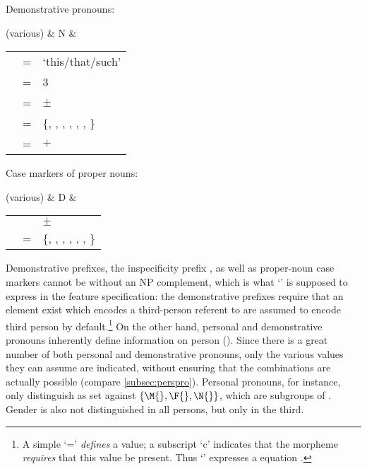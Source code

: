 \a Demonstrative pronouns:\medskip

	\begin{tabu} {}
	(various)
		& N
		& \begin{tabular}[t]{l l l}
			\ups{\Pred} & = & `this/that/such' \\
			\ups{\Pers} & = & 3 \\
			\ups{\Anim} & = & $\pm$ \\
			\ups{\Case} & = & \{\Aarg{}, \Parg{}, \Dat{}, \Gen{}, 
				\Loc{}, \Ins{}, \Caus{}\} \\
			\ups{\Spec} & = & $+$ \\
		\end{tabular}
	\end{tabu}
	
\a\label{ex:dlexsem-propn} Case markers of proper nouns:\medskip	
	
	\begin{tabu} {}
	(various)
		& D
		& \begin{tabular}[t]{l l l}
			\ups{\Anim} & \req{} & $\pm$ \\
			\ups{\Case} & = & \{\Aarg{}, \Parg{}, \Dat{}, \Gen{}, 
				\Loc{}, \Ins{}, \Caus{}\} \\
		\end{tabular}
	\end{tabu}\medskip
	
\xe

Demonstrative prefixes, the inspecificity prefix , as well as 
proper-noun case markers cannot be without an NP complement, which is what 
`\req{}' is supposed to express in the feature specification: the demonstrative 
prefixes require that an element exist which encodes a third-person referent to 
are assumed to encode third person by default.\footnote{A simple `=' 
\emph{defines} a value; a subscript `c' indicates that the morpheme 
\emph{requires} that this value be present. Thus `\req{}' expresses a 
 equation \citep[59--61]{bresnan2016}.} On the other hand, 
personal and demonstrative pronouns inherently define information on person 
(\Pers{}). Since there is a great number of both personal and demonstrative 
pronouns, only the various values they can assume are indicated, without 
ensuring that the combinations are actually possible (compare 
\autoref{subsec:perspro}). Personal pronouns, for instance, only distinguish 
\Inan{} as set against $\{\M{}, \F{}, \N{}\}$, which are subgroups of \An{}. 
Gender is also not distinguished in all persons, but only in the third.

